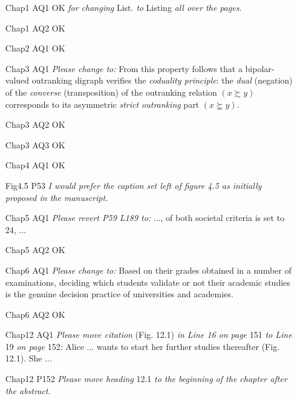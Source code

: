 \documentclass[english]{article}
\begin{document}
\begin{itemize}
\vspace{\baselineskip}
\item [Chap1 AQ1] OK \emph{for changing} List.\emph{ to} Listing \emph{all over the pages}.
\item [Chap1 AQ2] OK

\vspace{\baselineskip}
\item [Chap2 AQ1] OK

\vspace{\baselineskip}
\item [Chap3 AQ1] \emph{Please change to:}  From this property follows that a bipolar-valued outranking digraph verifies the \emph{coduality principle}: the \emph{dual} (negation) of the \emph{converse} (transposition) of the outranking relation $(x \succsim y)$ corresponds to its asymmetric \emph{strict outranking} part $(x \succnsim y)$.
\item [Chap3 AQ2] OK
\item [Chap3 AQ3] OK

\vspace{\baselineskip}
\item [Chap4 AQ1] OK
\item [Fig4.5 P53] \emph{I would prefer the caption set left of figure 4.5 as initially proposed in the manuscript.}   

\vspace{\baselineskip}
\item [Chap5 AQ1] \emph{Please revert P59 L189 to:} ..., of both societal criteria is set to 24, ...
\item [Chap5 AQ2] OK

\vspace{\baselineskip}
\item [Chap6 AQ1] \emph{Please change to:} Based on their grades obtained in a number of examinations, deciding which students validate or not their academic studies is the genuine decision practice of universities and academies. 
\item [Chap6 AQ2] OK

\vspace{\baselineskip}
\item [Chap12 AQ1] \emph{Please move citation} (Fig. 12.1) \emph{in Line 16 on page} 151 \emph{to Line} 19 \emph{on page} 152: Alice ... wants to start her further studies thereafter (Fig. 12.1). She ...
\item [Chap12 P152] \emph{Please move heading} 12.1 \emph{to the beginning of the chapter after the abstract}.


\end{itemize}
\end{document}
